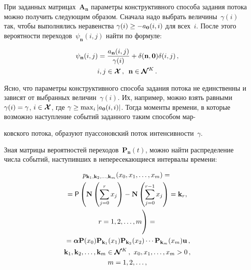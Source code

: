 {\begin{multicols}{2}
  При заданных матрицах~$\mathbf{A}_{\mathbf{n}}$ параметры 
конструктивного способа задания потока можно получить следующим образом. 
Сначала надо выбрать величины~$\gamma(i)$ так, чтобы выполнялись 
неравенства $\gamma(i)\hm\geq -a_{\mathbf{0}}(i,i)$ для всех~$i$. После этого 
вероятности переходов~$\psi_{\mathbf{n}}(i,j)$ найти по формуле:

\noindent
  \begin{multline*}
  \psi_{\mathbf{n}}(i,j)=\fr{%
  a_{\mathbf{n}}(i,j)}{\gamma(i)}+ 
\delta(\mathbf{n},\mathbf{0})\delta(i,j)\,,\\
  i,j\in \boldsymbol{\mathcal{X}}\,,\enskip \mathbf{n}\in 
\boldsymbol{\mathcal{N}}^K\,.
  \end{multline*}
    
  Ясно, что параметры конструктивного способа задания потока не 
единственны и зависят от выбранных величин~$\gamma(i)$. Их, например, 
можно взять равными $\gamma(i)\hm= \gamma$, $i\hm\in 
\boldsymbol{\mathcal{X}}$, где $\gamma\hm\geq \max\nolimits_i \vert 
a_{\mathbf{0}}(i,i)\vert$. Тогда моменты времени, в которые возможно 
наступление событий заданного таким способом мар-\linebreak\vspace*{-12pt}

\columnbreak

\noindent
ковского потока, образуют 
пуассоновский поток интенсивности~$\gamma$.  
  
  Зная матрицы вероятностей переходов~$\mathbf{P}_{\mathbf{n}}(t)$, можно 
найти распределение числа событий, наступивших в непересекающиеся 
интервалы времени:

\vspace*{-9pt}

\noindent
  \begin{multline}
  p_{\mathbf{k}_1, \mathbf{k}_2,\ldots , \mathbf{k}_m}(x_0,x_1,\ldots , 
x_m)={}\\
{}={\sf P} \left(\mathbf{N}\left(
\sum\limits^r_{j=0} x_j\right) -\mathbf{N}\left( 
\sum\limits^{r-1}_{j=0} x_j\right) =\mathbf{k}_r,\right.\\
\left.r=1,2,\ldots , m
\vphantom{\left(
\sum\limits^r_{j=0} x_j\right)}
\right)={}\\
  {}=
  \boldsymbol{\alpha}\mathbf{P}(x_0) \mathbf{P}_{\mathbf{k}_1}(x_1) 
\mathbf{P}_{\mathbf{k}_2}(x_2)\cdots \mathbf{P}_{\mathbf{k}_m}(x_m) 
\mathbf{u}\,,\\
  \mathbf{k}_1, \mathbf{k}_2,\ldots , \mathbf{k}_m\in 
\boldsymbol{\mathcal{N}}^K\,,\ x_0, x_1, \ldots , x_m>0\,,\\
 m=1,2,\ldots ,
  \label{e22-n}
  \end{multline}
  

\end{multicols}}
